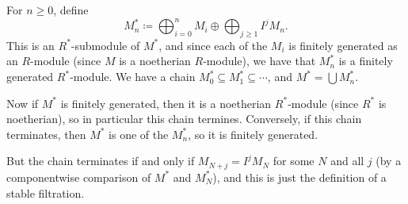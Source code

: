 For $n\geq 0$, define
\[ M_n^* \coloneqq \bigoplus_{i=0}^n M_i\oplus \bigoplus_{j\geq 1} I^jM_n. \]
This is an $R^*$-submodule of $M^*$, and since each of the $M_i$ is finitely
generated as an $R$-module (since $M$ is a noetherian $R$-module), we have that
$M_n^*$ is a finitely generated $R^*$-module. We have a chain
$M_0^* \subseteq M_1^* \subseteq \cdots$, and $M^* = \bigcup M_n^*$.

Now if $M^*$
is finitely generated, then it is a noetherian  $R^*$-module (since $R^*$ is noetherian),
so in particular this chain termines. Conversely, if this chain terminates, then
$M^*$ is one of the $M_n^*$, so it is finitely generated.

But the chain terminates
if and only if $M_{N+j} = I^jM_N$ for some $N$ and all $j$ (by a componentwise
comparison of $M^*$ and $M_N^*$), and this is just the definition of a stable
filtration.
